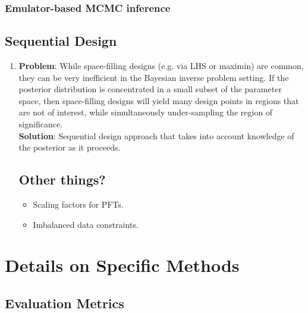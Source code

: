 \documentclass[12pt]{article}
\begin{document}
\subsubsection{Emulator-based MCMC inference}


\subsection{Sequential Design}
\begin{enumerate}
\item \textbf{Problem}: While space-filling designs (e.g. via LHS or maximin) are common, they can be very inefficient in the Bayesian inverse problem setting. If the posterior distribution is concentrated in a small 
subset of the parameter space, then space-filling designs will yield many design points in regions that are not of interest, while simultaneously under-sampling the region of significance.  \\
	\textbf{Solution}: Sequential design approach that takes into account knowledge of the posterior as it proceeds. 
	
\subsection{Other things?}
\begin{itemize}
\item Scaling factors for PFTs. 
\item Imbalanced data constraints. 
\end{itemize}
	
\end{enumerate}

\section{Details on Specific Methods}

\subsection{Evaluation Metrics}
\end{document}
